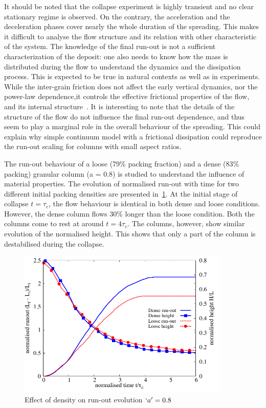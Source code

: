 It should be noted that the collapse experiment is highly transient and no 
clear stationary regime is observed. On the contrary, the acceleration and the 
deceleration phases cover nearly the whole duration of the spreading. This 
makes it difficult to analyse the flow structure and its relation with other 
characteristic of the system. The knowledge of the final run-out is not a 
sufficient characterization of the deposit: one also needs to know how the mass 
is distributed during the flow to understand the dynamics and the dissipation 
process. This is expected to be true in natural contexts as well as in 
experiments. While the inter-grain friction does not affect the early vertical 
dynamics, nor the power-law dependence,it controls the effective frictional 
properties of the flow, and its internal structure~\citep{Staron2007a}. It is 
interesting to note that the details of the structure of the flow do not 
influence the final run-out dependence, and thus seem to play a marginal role 
in the overall behaviour of the spreading. This could explain why simple 
continuum model with a frictional dissipation could reproduce the run-out 
scaling for columns with small aspect ratios.

The run-out behaviour of a loose (79\% packing fraction) and a dense (83\% 
packing) granular column (a = 0.8) is studied to understand the influence of 
material properties. The evolution of normalised run-out with time for two 
different initial packing 
densities are presented in~\cref{fig:runout_height_dense_r18}. At the initial 
stage of collapse $t=\tau_c$, the flow behaviour is identical in both dense and 
loose conditions. However, the dense column flows 30\% longer than the loose 
condition. Both the columns come to rest at around $t = 4\tau_c$. The columns, 
however, show similar evolution of the normalised height. This shows that only 
a part of the column is destabilised during the collapse.
\begin{figure}[h]
\centering
\includegraphics[width=0.9\textwidth]{runout_height_dense_r18}
\caption{Effect of density on run-out evolution $`a' = 0.8$}
\label{fig:runout_height_dense_r18}
\end{figure}

